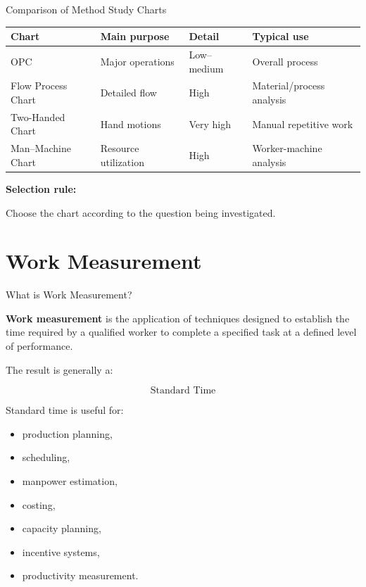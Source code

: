 \documentclass[aspectratio=169,10pt]{beamer}
\begin{document}

\begin{frame}[shrink=18]{Comparison of Method Study Charts}
\small

\begin{tabularx}{\textwidth}{YYYY}
\toprule
Chart & Main purpose & Detail & Typical use \\
\midrule
OPC & Major operations & Low--medium & Overall process\\
Flow Process Chart & Detailed flow & High & Material/process analysis\\
Two-Handed Chart & Hand motions & Very high & Manual repetitive work\\
Man--Machine Chart & Resource utilization & High & Worker-machine analysis\\
\bottomrule
\end{tabularx}

\vspace{8pt}

\textbf{Selection rule:}

Choose the chart according to the question being investigated.

\end{frame}


\section{Work Measurement}

\begin{frame}[shrink=18]{What is Work Measurement?}
\small

\textbf{Work measurement} is the application of techniques designed
to establish the time required by a qualified worker to complete
a specified task at a defined level of performance.

\vspace{5pt}

The result is generally a:

\[
\boxed{\text{Standard Time}}
\]

Standard time is useful for:

\begin{itemize}
    \item production planning,
    \item scheduling,
    \item manpower estimation,
    \item costing,
    \item capacity planning,
    \item incentive systems,
    \item productivity measurement.
\end{itemize}

\end{frame}
\end{document}
